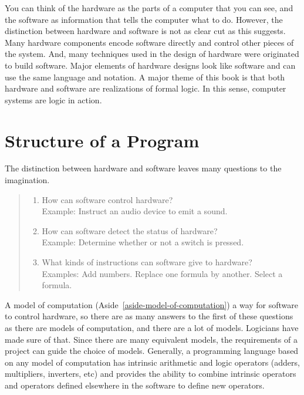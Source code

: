 You can think of the hardware as
the parts of a computer that you can see,
and the software as information that tells the computer what to do.
However, the distinction between hardware and software is not as
clear cut as this suggests. Many hardware components
encode software directly and control other pieces of the system.
And, many techniques used in the design of
hardware were originated to build software.
Major elements of hardware designs look like software
and can use the same language and notation.
A major theme of this book
is that both hardware and software are realizations of formal logic.
In this sense, computer systems are
logic in action.

\section{Structure of a Program}

The distinction between hardware and software
leaves many questions to the imagination.
\begin{quote}
\begin{enumerate}
\item How can software control hardware?\\
      Example: Instruct an audio device to emit a sound.
\item How can software detect the status of hardware?\\
      Example: Determine whether or not a switch is pressed.
\item What kinds of instructions can software give to hardware?\\
      Examples: Add numbers. Replace one formula by another. Select a formula.
\end{enumerate}
\end{quote}

A model of computation (Aside~\ref{aside-model-of-computation})
a way for software to control hardware,
so there are as many answers to the first of these questions
as there are models of computation, and
there are a lot of models.
Logicians have made sure of that.
Since there are many equivalent models,
the requirements of a project can guide the choice of models.
Generally, a programming language based on any model of computation
has intrinsic arithmetic and logic operators
(adders, multipliers, inverters, etc)
and provides the ability to combine
intrinsic operators and operators
defined elsewhere in the software to
define new operators.

